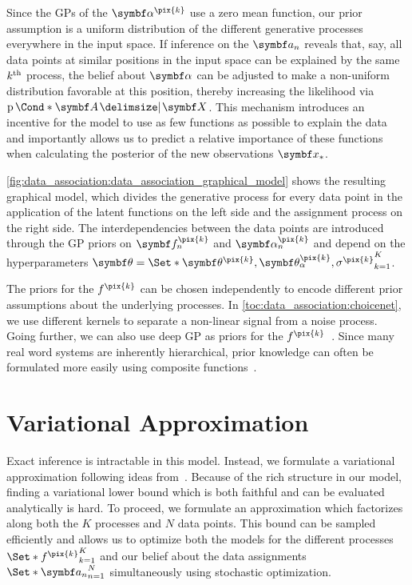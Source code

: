 Since the GPs of the $\mat{\alpha^{\pix{k}}}$ use a zero mean function, our prior assumption is a uniform distribution of the different generative processes everywhere in the input space.
If inference on the $\mat{a_n}$ reveals that, say, all data points at similar positions in the input space can be explained by the same $k^{\text{th}}$ process, the belief about $\mat{\alpha}$ can be adjusted to make a non-uniform distribution favorable at this position, thereby increasing the likelihood via $\Prob*{\mat{A} \given \mat{X}}$.
This mechanism introduces an incentive for the model to use as few functions as possible to explain the data and importantly allows us to predict a relative importance of these functions when calculating the posterior of the new observations $\mat{x_\ast}$.

\cref{fig:data_association:data_association_graphical_model} shows the resulting graphical model, which divides the generative process for every data point in the application of the latent functions on the left side and the assignment process on the right side.
The interdependencies between the data points are introduced through the GP priors on $\rv{f_n^{\pix{k}}}$ and $\rv{\alpha_n^{\pix{k}}}$ and depend on the hyperparameters $\mat{\theta} = \Set*{\mat{\theta^{\pix{k}}}, \mat{\theta_\alpha^{\pix{k}}}, \sigma^{\pix{k}}}_{k=1}^K$.

The priors for the $f^{\pix{k}}$ can be chosen independently to encode different prior assumptions about the underlying processes.
In \cref{toc:data_association:choicenet}, we use different kernels to separate a non-linear signal from a noise process.
Going further, we can also use deep GP as priors for the $f^{\pix{k}}$~\parencite{damianou_deep_2013, salimbeni_doubly_2017}.
Since many real word systems are inherently hierarchical, prior knowledge can often be formulated more easily using composite functions~\parencite{kaiser_bayesian_2018}.


\section{Variational Approximation}
\label{toc:data_association:approximation}
Exact inference is intractable in this model.
Instead, we formulate a variational approximation following ideas from~\parencite{hensman_gaussian_2013, salimbeni_doubly_2017}.
Because of the rich structure in our model, finding a variational lower bound which is both faithful and can be evaluated analytically is hard.
To proceed, we formulate an approximation which factorizes along both the $K$ processes and $N$ data points.
This bound can be sampled efficiently and allows us to optimize both the models for the different processes $\Set*{f^{\pix{k}}}_{k=1}^K$ and our belief about the data assignments $\Set*{\mat{a_n}}_{n=1}^N$ simultaneously using stochastic optimization.

